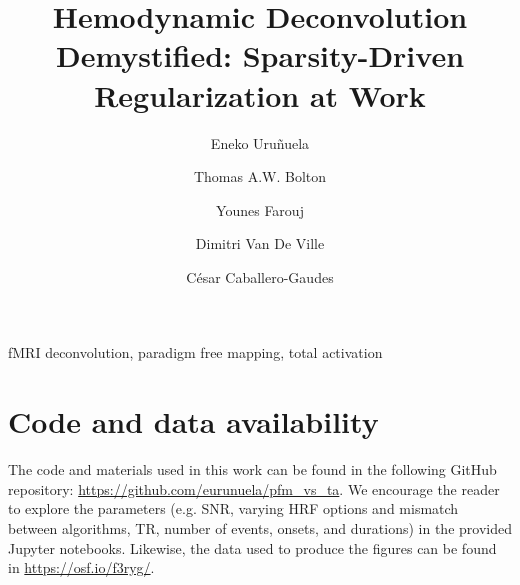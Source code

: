\documentclass[preprint]{elsarticle}
\begin{document}
\begin{frontmatter}

\title{Hemodynamic Deconvolution Demystified: Sparsity-Driven Regularization at Work}

\author[bcbl,upv]{Eneko Uru\~nuela}

\author[chuv,epfl]{Thomas A.W. Bolton}
\author[epfl]{Younes Farouj}
\author[epfl,unige]{Dimitri Van De Ville}
\author[bcbl]{C\'{e}sar Caballero-Gaudes}

\address[bcbl]{Basque Center on Cognition, Brain and Language (BCBL), Donostia-San Sebasti\'{a}n, Spain.}
\address[upv]{University of the Basque Country (EHU/UPV), Donostia-San Sebasti\'{a}n, Spain.}
\address[chuv]{Gamma Knife Center, Department of Clinical Neuroscience, Centre Hospitalier Universitaire Vaudois (CHUV), Lausanne, Switzerland}
\address[epfl]{Ecole polytechnique f\'ed\'erale de Lausanne (EPFL), Lausanne, Switzerland.}
\address[unige]{Faculty of Medicine, University of Geneva, Geneva, Switzerland}

\begin{abstract}

\end{abstract}

\begin{keyword}
fMRI deconvolution, paradigm free mapping, total activation
\end{keyword}

\end{frontmatter}

\linenumbers











\section{Code and data availability}
\label{sec:github}
The code and materials used in this work can be found in the following GitHub repository: \url{https://github.com/eurunuela/pfm_vs_ta}. We encourage the reader to explore the parameters (e.g. SNR, varying HRF options and mismatch between algorithms, TR, number of events, onsets, and durations) in the provided Jupyter notebooks. Likewise, the data used to produce the figures can be found in \url{https://osf.io/f3ryg/}.
\end{document}
